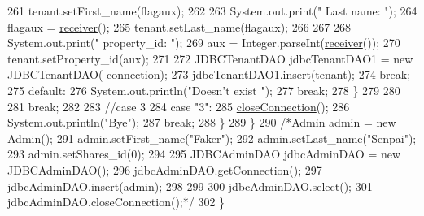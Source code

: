 \begin{DoxyCode}
261                         tenant.setFirst\_name(flagaux);
262                         
263                         System.out.print(\textcolor{stringliteral}{"    Last name: "});
264                         flagaux = \mbox{\hyperlink{classcms_1_1_c_m_s_ad13be0e97a0bb295dcedd134942a79b4}{receiver}}();
265                         tenant.setLast\_name(flagaux);
266                         
267                         
268                         System.out.print(\textcolor{stringliteral}{"    property\_id: "});
269                         aux =  Integer.parseInt(\mbox{\hyperlink{classcms_1_1_c_m_s_ad13be0e97a0bb295dcedd134942a79b4}{receiver}}());
270                         tenant.setProperty\_id(aux);
271                         
272                         JDBCTenantDAO jdbcTenantDAO1 = \textcolor{keyword}{new} JDBCTenantDAO(
      \mbox{\hyperlink{classcms_1_1_c_m_s_afc28cfd2c4356509b85775219b7b1e05}{connection}});
273                         jdbcTenantDAO1.insert(tenant);
274                     \textcolor{keywordflow}{break};
275                     \textcolor{keywordflow}{default}:
276                         System.out.println(\textcolor{stringliteral}{"Doesn't exist "});
277                     \textcolor{keywordflow}{break};
278                 \}
279                 
280         
281                 \textcolor{keywordflow}{break};
282                 
283             \textcolor{comment}{//case 3}
284             \textcolor{keywordflow}{case} \textcolor{stringliteral}{"3"}:
285                 \mbox{\hyperlink{classcms_1_1_c_m_s_a8f49d9319782a9aa839dd78bb30315cf}{closeConnection}}();
286                 System.out.println(\textcolor{stringliteral}{"Bye"});
287                 \textcolor{keywordflow}{break};
288         \}
289         \}
290         \textcolor{comment}{/*Admin admin = new Admin();}
291 \textcolor{comment}{        admin.setFirst\_name("Faker");}
292 \textcolor{comment}{        admin.setLast\_name("Senpai");}
293 \textcolor{comment}{        admin.setShares\_id(0);}
294 \textcolor{comment}{         }
295 \textcolor{comment}{        JDBCAdminDAO jdbcAdminDAO = new JDBCAdminDAO();}
296 \textcolor{comment}{        jdbcAdminDAO.getConnection();}
297 \textcolor{comment}{        jdbcAdminDAO.insert(admin);}
298 \textcolor{comment}{}
299 \textcolor{comment}{         }
300 \textcolor{comment}{        jdbcAdminDAO.select();}
301 \textcolor{comment}{        jdbcAdminDAO.closeConnection();*/}
302     \}
\end{DoxyCode}
\mbox{\label{classcms_1_1_c_m_s_a3256378f3b9ccd38f1db10ee80daf9f3}} 
